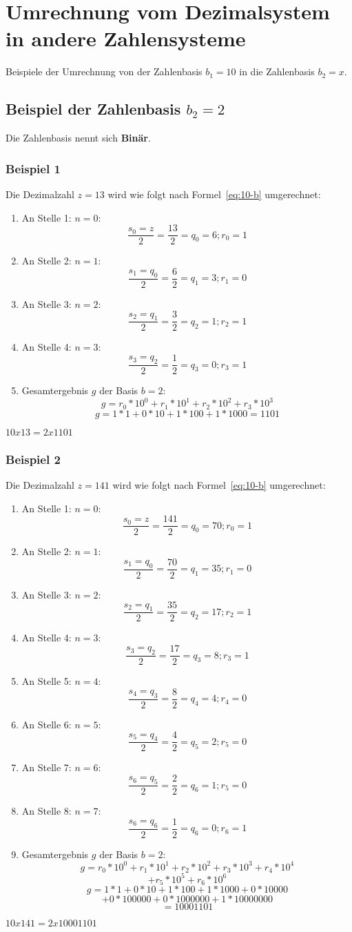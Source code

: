 \section{Umrechnung vom Dezimalsystem in andere Zahlensysteme}
Beispiele der Umrechnung von der Zahlenbasis $b_{1}=10$ in die Zahlenbasis $b_{2}=x$.
\subsection{Beispiel der Zahlenbasis $b_{2}=2$}
Die Zahlenbasis nennt sich \textbf{Binär}.
\subsubsection{Beispiel 1}
Die Dezimalzahl $z=13$ wird wie folgt nach Formel~\ref{eq:10-b} umgerechnet:
\begin{enumerate}
    \item An Stelle 1: $n=0$: \[\frac{s_{0}=z}{2}=\frac{13}{2}=q_{0}=6; r_{0}=1\]
    \item An Stelle 2: $n=1$: \[\frac{s_{1}=q_{0}}{2}=\frac{6}{2}=q_{1}=3; r_{1}=0\]
    \item An Stelle 3: $n=2$: \[\frac{s_{2}=q_{1}}{2}=\frac{3}{2}=q_{2}=1; r_{2}=1\]
    \item An Stelle 4: $n=3$: \[\frac{s_{3}=q_{2}}{2}=\frac{1}{2}=q_{3}=0; r_{3}=1\]
    \item Gesamtergebnis $g$ der Basis $b=2$: \[g=r_{0}*10^{0}+r_{1}*10^{1}+r_{2}*10^{2}+r_{3}*10^{3}\] \[g=1*1+0*10+1*100+1*1000=1101\]
\end{enumerate}
\(10x13=2x1101\)
\subsubsection{Beispiel 2}
Die Dezimalzahl $z=141$ wird wie folgt nach Formel~\ref{eq:10-b} umgerechnet:
\begin{enumerate}
    \item An Stelle 1: $n=0$: \[\frac{s_{0}=z}{2}=\frac{141}{2}=q_{0}=70; r_{0}=1\]
    \item An Stelle 2: $n=1$: \[\frac{s_{1}=q_{0}}{2}=\frac{70}{2}=q_{1}=35; r_{1}=0\]
    \item An Stelle 3: $n=2$: \[\frac{s_{2}=q_{1}}{2}=\frac{35}{2}=q_{2}=17; r_{2}=1\]
    \item An Stelle 4: $n=3$: \[\frac{s_{3}=q_{2}}{2}=\frac{17}{2}=q_{3}=8; r_{3}=1\]
    \item An Stelle 5: $n=4$: \[\frac{s_{4}=q_{3}}{2}=\frac{8}{2}=q_{4}=4; r_{4}=0\]
    \item An Stelle 6: $n=5$: \[\frac{s_{5}=q_{4}}{2}=\frac{4}{2}=q_{5}=2; r_{5}=0\]
    \item An Stelle 7: $n=6$: \[\frac{s_{6}=q_{5}}{2}=\frac{2}{2}=q_{6}=1; r_{5}=0\]
    \item An Stelle 8: $n=7$: \[\frac{s_{6}=q_{6}}{2}=\frac{1}{2}=q_{6}=0; r_{6}=1\]
    \item Gesamtergebnis $g$ der Basis $b=2$: \[g=r_{0}*10^{0}+r_{1}*10^{1}+r_{2}*10^{2}+r_{3}*10^{3}+r_{4}*10^{4}\]\[+r_{5}*10^{5}+r_{6}*10^{6}\] \[g=1*1+0*10+1*100+1*1000+0*10000\]\[+0*100000+0*1000000+1*10000000\]\[=10001101\]
\end{enumerate}
\(10x141=2x10001101\)

